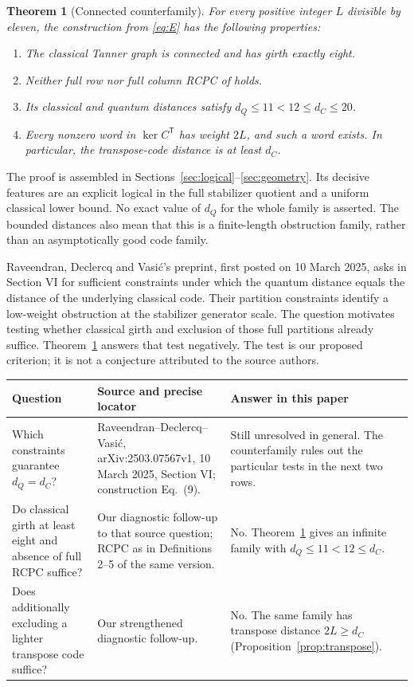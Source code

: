 \documentclass[11pt]{article}
\newtheorem{theorem}{Theorem}[section]
\theoremstyle{definition}\newtheorem{definition}[theorem]{Definition}
\begin{document}
\begin{theorem}[Connected counterfamily]\label{thm:main}
For every positive integer $L$ divisible by eleven, the construction from
\eqref{eq:E} has the following properties:
\begin{enumerate}
\item The classical Tanner graph is connected and has girth exactly eight.
\item Neither full row nor full column RCPC of
\cite[Definitions 2--5]{RDV} holds.
\item Its classical and quantum distances satisfy
$d_Q\leq11<12\leq d_C\leq20$.
\item Every nonzero word in $\ker C^{\mathsf T}$ has weight $2L$, and
such a word exists. In particular, the transpose-code distance is at least $d_C$.
\end{enumerate}
\end{theorem}

The proof is assembled in Sections~\ref{sec:logical}--\ref{sec:geometry}.
Its decisive features are an explicit logical in the full stabilizer
quotient and a uniform classical lower bound. No exact value of $d_Q$ for
the whole family is asserted. The bounded distances also mean that this
is a finite-length obstruction family, rather than an asymptotically good
code family.

Raveendran, Declercq and Vasi\'c's preprint, first posted on 10 March 2025,
asks in Section VI for sufficient constraints under which the quantum
distance equals the distance of the underlying classical code. Their
partition constraints identify a low-weight obstruction at the stabilizer
generator scale. The question motivates testing whether classical girth
and exclusion of those full partitions already suffice. Theorem~\ref{thm:main}
answers that test negatively. The test is our proposed criterion; it is
not a conjecture attributed to the source authors.

\begin{longtable}{@{}P{.26\textwidth}P{.29\textwidth}P{.39\textwidth}@{}}
\toprule Question&Source and precise locator&Answer in this paper\\\midrule\endhead
Which constraints guarantee $d_Q=d_C$?&
Raveendran--Declercq--Vasi\'c, arXiv:2503.07567v1,
10 March 2025, Section VI; construction Eq.~(9).&
Still unresolved in general. The counterfamily rules out the particular
tests in the next two rows.\\[4pt]
Do classical girth at least eight and absence of full RCPC suffice?&
Our diagnostic follow-up to that source question; RCPC as in
Definitions 2--5 of the same version.&
No. Theorem~\ref{thm:main} gives an infinite family with
$d_Q\leq11<12\leq d_C$.\\[4pt]
Does additionally excluding a lighter transpose code suffice?&
Our strengthened diagnostic follow-up.&
No. The same family has transpose distance $2L\geq d_C$
(Proposition~\ref{prop:transpose}).\\
\bottomrule
\end{longtable}
\end{document}

